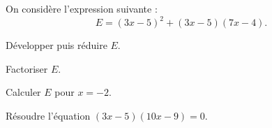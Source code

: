 On considère l'expression suivante :
 \[ E = (3x - 5)^2 + (3x - 5)(7x - 4).\]
\begin{myenumerate}
\item Développer puis réduire $E$.
\item Factoriser $E$.
\item Calculer $E$ pour $x = - 2$.
\item Résoudre l'équation $(3x- 5)(10x - 9) = 0$.
\end{myenumerate}